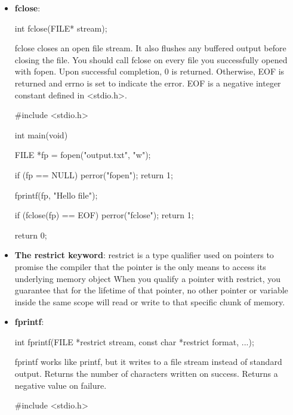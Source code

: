 \documentclass{report}
\begin{document}
\begin{itemize}
\begin{cppcode}
{                    fclose(fp);
                    return 0;
                }
            \end{cppcode}
        \item \textbf{fclose}: 
            \bigbreak \noindent 
            \begin{cppcode}
            int fclose(FILE* stream);
            \end{cppcode}
            \bigbreak \noindent 
            fclose closes an open file stream. It also flushes any buffered output before closing the file.
            \bigbreak \noindent 
            You should call fclose on every file you successfully opened with fopen.
            \bigbreak \noindent 
            Upon successful completion, 0 is returned.  Otherwise, EOF is returned and errno is set to indicate the error.
            \bigbreak \noindent 
            EOF is a negative integer constant defined in <stdio.h>.
            \bigbreak \noindent 
            \begin{cppcode}
            #include <stdio.h>

            int main(void) {
                FILE *fp = fopen("output.txt", "w");

                if (fp == NULL) {
                    perror("fopen");
                    return 1;
                }

                fprintf(fp, "Hello file\n");

                if (fclose(fp) == EOF) {
                    perror("fclose");
                    return 1;
                }

                return 0;
            }
            \end{cppcode}
        \item \textbf{The restrict keyword}: restrict is a type qualifier used on pointers to promise the compiler that the pointer is the only means to access its underlying memory object
            \bigbreak \noindent 
            When you qualify a pointer with restrict, you guarantee that for the lifetime of that pointer, no other pointer or variable inside the same scope will read or write to that specific chunk of memory.
        \item \textbf{fprintf}: 
            \bigbreak \noindent 
            \begin{cppcode}
            int fprintf(FILE *restrict stream, const char *restrict format, ...);
            \end{cppcode}
            \bigbreak \noindent 
            fprintf works like printf, but it writes to a file stream instead of standard output.
            \bigbreak \noindent 
            Returns the number of characters written on success.
            \bigbreak \noindent 
            Returns a negative value on failure.
            \bigbreak \noindent 
            \begin{cppcode}
                #include <stdio.h>


\end{cppcode}
\end{itemize}
\end{document}
